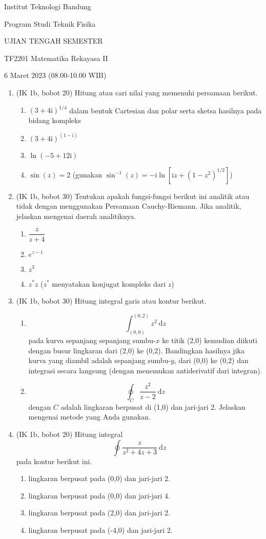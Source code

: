 \documentclass[10pt,english]{article}
\renewcommand{\imath}{\mathrm{i}}
\begin{document}
\thispagestyle{empty}

{\centering
Institut Teknologi Bandung

Program Studi Teknik Fisika

{\LARGE UJIAN TENGAH SEMESTER}

TF2201 Matematika Rekayasa II

6 Maret 2023 (08.00-10.00 WIB)
\par}


\begin{enumerate}
%
\item (IK 1b, bobot 20) Hitung atau cari nilai yang memenuhi persamaan berikut.
  \begin{enumerate}
  \item $(3 + 4\imath)^{1/4}$ dalam bentuk Cartesian dan polar serta sketsa
  hasilnya pada bidang kompleks
  \item $(3 + 4\imath)^{(1-\imath)}$
  \item $\ln(-5+12\imath)$
  \item $\sin(z)=2$ (gunakan $\sin^{-1}(z) = -\imath \ln\left[\imath z+\left(1-z^{2}\right)^{1/2}\right]$)
  \end{enumerate}
%
\item (IK 1b, bobot 30) Tentukan apakah fungsi-fungsi berikut ini analitik atau tidak dengan
menggunakan Persamaan Cauchy-Riemann. Jika analitik, jelaskan mengenai
daerah analitiknya.
  \begin{enumerate}
  \item $\dfrac{z}{z+4}$
  \item $e^{z-1}$
  \item $z^{3}$
  \item $z^{*}z$ ($z^{*}$ menyatakan konjugat kompleks dari $z$)
  \end{enumerate}
%
\item (IK 1b, bobot 30) Hitung integral garis atau kontur berikut.
  \begin{enumerate}
  \item $$\int_{(0,0)}^{(0,2)} z^{2} \ \mathrm{d}z$$
  pada kurva sepanjang
  sepanjang sumbu-$x$ ke titik (2,0) kemudian diikuti dengan busur
  lingkaran dari (2,0) ke (0,2). Bandingkan hasilnya jika kurva yang diambil
  adalah sepanjang sumbu-$y$, dari (0,0) ke (0,2) dan integrasi secara langsung (dengan
  menemukan antiderivatif dari integran).
  \item $$\oint_{C} \dfrac{z^2}{z - 2} \ \mathrm{d}z$$
  dengan $C$ adalah
  lingkaran berpusat di (1,0) dan jari-jari 2. Jelaskan mengenai metode yang Anda gunakan.
  \end{enumerate}
%
\item (IK 1b, bobot 20) Hitung integral
\[
\oint\frac{z}{z^{2} + 4z +3}\ \mathrm{d}z
\]
pada kontur berikut ini.
\begin{enumerate}
\item lingkaran berpusat pada (0,0) dan jari-jari 2.
\item lingkaran berpusat pada (0,0) dan jari-jari 4.
\item lingkaran berpusat pada (2,0) dan jari-jari 2.
\item lingkaran berpusat pada (-4,0) dan jari-jari 2.
\end{enumerate}
\end{enumerate}
\end{document}
